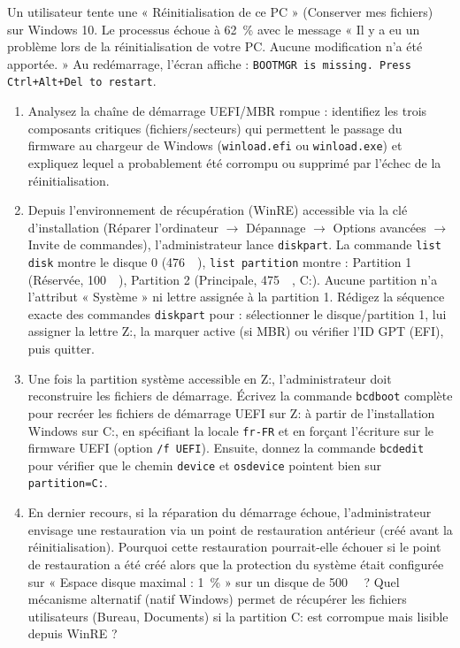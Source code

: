 \documentclass[11pt]{article}
\begin{document}
\begin{exercice}
Un utilisateur tente une « Réinitialisation de ce PC » (Conserver mes fichiers) sur Windows 10. Le processus échoue à \SI{62}{\%} avec le message « Il y a eu un problème lors de la réinitialisation de votre PC. Aucune modification n'a été apportée. » Au redémarrage, l'écran affiche : \texttt{BOOTMGR is missing. Press Ctrl+Alt+Del to restart}.
\begin{enumerate}
    \item Analysez la chaîne de démarrage UEFI/MBR rompue : identifiez les trois composants critiques (fichiers/secteurs) qui permettent le passage du firmware au chargeur de Windows (\texttt{winload.efi} ou \texttt{winload.exe}) et expliquez lequel a probablement été corrompu ou supprimé par l'échec de la réinitialisation.
    \item Depuis l'environnement de récupération (WinRE) accessible via la clé d'installation (Réparer l'ordinateur $\rightarrow$ Dépannage $\rightarrow$ Options avancées $\rightarrow$ Invite de commandes), l'administrateur lance \texttt{diskpart}. La commande \texttt{list disk} montre le disque 0 (\SI{476}{\giga\byte}), \texttt{list partition} montre : Partition 1 (Réservée, \SI{100}{\mega\byte}), Partition 2 (Principale, \SI{475}{\giga\byte}, C:). Aucune partition n'a l'attribut « Système » ni lettre assignée à la partition 1. Rédigez la séquence exacte des commandes \texttt{diskpart} pour : sélectionner le disque/partition 1, lui assigner la lettre Z:, la marquer active (si MBR) ou vérifier l'ID GPT (EFI), puis quitter.
    \item Une fois la partition système accessible en Z:, l'administrateur doit reconstruire les fichiers de démarrage. Écrivez la commande \texttt{bcdboot} complète pour recréer les fichiers de démarrage UEFI sur Z: à partir de l'installation Windows sur C:, en spécifiant la locale \texttt{fr-FR} et en forçant l'écriture sur le firmware UEFI (option \texttt{/f UEFI}). Ensuite, donnez la commande \texttt{bcdedit} pour vérifier que le chemin \texttt{device} et \texttt{osdevice} pointent bien sur \texttt{partition=C:}.
    \item En dernier recours, si la réparation du démarrage échoue, l'administrateur envisage une restauration via un point de restauration antérieur (créé avant la réinitialisation). Pourquoi cette restauration pourrait-elle échouer si le point de restauration a été créé alors que la protection du système était configurée sur « Espace disque maximal : \SI{1}{\%} » sur un disque de \SI{500}{\giga\byte} ? Quel mécanisme alternatif (natif Windows) permet de récupérer les fichiers utilisateurs (Bureau, Documents) si la partition C: est corrompue mais lisible depuis WinRE ?
\end{enumerate}
\end{exercice}
\end{document}
